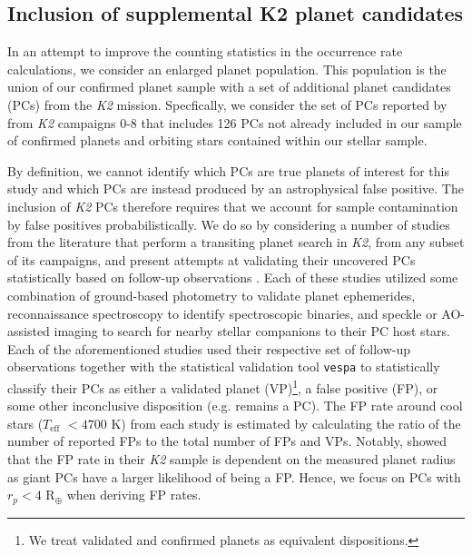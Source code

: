 \documentclass[twocolumn]{emulateapj}
\newcommand{\ktwo}[1]{\emph{K2}#1}
\newcommand{\teff}[1]{$T_{\text{eff}}$#1}
\begin{document}
\subsection{Inclusion of supplemental K2 planet candidates}
In an attempt to improve the counting statistics in the occurrence rate calculations,
we consider an enlarged planet population. This population is the union of our confirmed planet sample with
a set of additional planet candidates (PCs) from the \ktwo{}
mission. Specfically, we consider the set of PCs reported by \cite{kruse19}
from \ktwo{} campaigns 0-8 that includes 126 PCs not already included in our sample of confirmed planets
and orbiting stars contained within our stellar sample.

By definition, we cannot identify which PCs are true planets of interest for this study and
which PCs are instead produced by an astrophysical false positive. 
The inclusion of \ktwo{} PCs therefore requires that we account for sample contamination by false positives
probabilistically. We do so by considering
a number of studies from the literature that perform a transiting planet search in \ktwo{,} from any subset of its campaigns,
and present attempts at validating their uncovered PCs statistically based on follow-up observations
\citep{montet15,crossfield16b,dressing17,hirano18,livingston18a,mayo18}. Each of these studies utilized some combination of
ground-based photometry to validate planet ephemerides, reconnaissance
spectroscopy to identify spectroscopic binaries, and speckle or AO-assisted imaging to search for nearby stellar companions to
their PC host stars. Each of the aforementioned studies used their respective set of follow-up observations together with the
statistical validation tool \texttt{vespa} \citep{morton12,morton15} to statistically classify their PCs as either a validated
planet (VP)\footnote{We treat validated and confirmed planets as equivalent dispositions.},
a false positive (FP), or some other inconclusive disposition (e.g. remains a PC). The FP rate around cool
stars (\teff{} $< 4700$ K) from each study is estimated by calculating the ratio of the number of reported FPs to
the total number of FPs and VPs. Notably, \cite{crossfield16b} showed that the FP rate in their \ktwo{} sample is dependent
on the measured planet radius as giant PCs have a larger likelihood of
being a FP. Hence, we focus on PCs with $r_p<4$ R$_{\oplus}$ when deriving FP rates.
\end{document}
